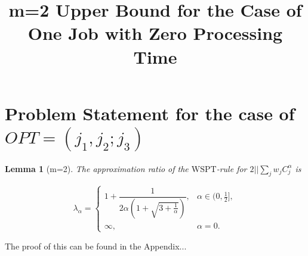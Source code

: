 \documentclass[11pt]{article}
\newtheorem{lemma}{Lemma}
\begin{document}
\title{m=2 Upper Bound for the Case of One Job with Zero Processing Time}
\author{}
\date{}
\maketitle

\section*{Problem Statement for the case of \(OPT= (j_1, j_2 ; j_3)\)}

\begin{lemma}[m=2]

    The approximation ratio of the $\mathrm{WSPT}$-rule for $2||\sum_{j} w_j C^{\alpha}_j$ is

   \[
\lambda_{\alpha}
=
\begin{cases}
1+\dfrac{1}{2\alpha\left(1+\sqrt{3+\frac{1}{\alpha}}\right)},
& \alpha\in (0,\frac12],\\[1.2ex]
\infty,
& \alpha=0.
\end{cases}
\]
\end{lemma}
The proof of this can be found in the Appendix...
\end{document}
